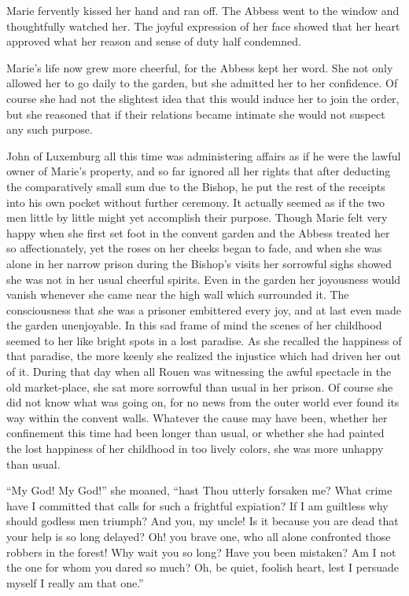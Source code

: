 Marie fervently kissed her hand and ran off. The Abbess went to the
window and thoughtfully watched her. The joyful expression of her face
showed that her heart approved what her reason and sense of duty half
condemned.

Marie's life now grew more cheerful, for the Abbess kept her word. She
not only allowed her to go daily to the garden, but she admitted her to
her confidence. Of course she had not the slightest idea that this would
induce her to join the order, but she reasoned that if their relations
became intimate she would not suspect any such purpose.

John of Luxemburg all this time was administering affairs as if he were
the lawful owner of Marie's property, and so far ignored all her rights
that after deducting the comparatively small sum due to the Bishop, he
put the rest of the receipts into his own pocket without further
ceremony. It actually seemed as if the two men little by little might
yet accomplish their purpose. Though Marie felt very happy when she
first set foot in the convent garden and the Abbess treated her so
affectionately, yet the roses on her cheeks began to fade, and when she
was alone in her narrow prison during the Bishop's visits her sorrowful
sighs showed she was not in her usual cheerful spirits. Even in the
garden her joyousness would vanish whenever she came near the high wall
which surrounded it. The consciousness that she was a prisoner
embittered every joy, and at last even made the garden unenjoyable. In
this sad frame of mind the scenes of her childhood seemed to her like
bright spots in a lost paradise. As she recalled the happiness of that
paradise, the more keenly she realized the injustice which had driven
her out of it. During that day when all Rouen was witnessing the awful
spectacle in the old market-place, she sat more sorrowful than usual in
her prison. Of course she did not know what was going on, for no news
from the outer world ever found its way within the convent walls.
Whatever the cause may have been, whether her confinement this time had
been longer than usual, or whether she had painted the lost happiness of
her childhood in too lively colors, she was more unhappy than usual.

``My God! My God!'' she moaned, ``hast Thou utterly forsaken me? What
crime have I committed that calls for such a frightful expiation? If I
am guiltless why should godless men triumph? And you, my uncle! Is it
because you are dead that your help is so long delayed? Oh! you brave
one, who all alone confronted those robbers in the forest! Why wait you
so long? Have you been mistaken? Am I not the one for whom you dared so
much? Oh, be quiet, foolish heart, lest I persuade myself I really am
that one.''

